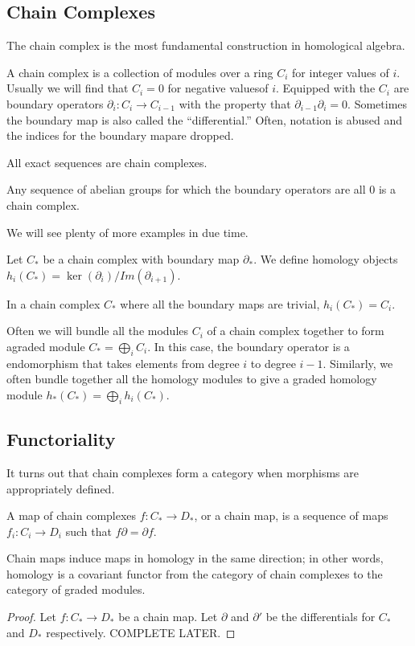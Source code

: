 \subsection{Chain Complexes}
The chain complex is the most fundamental construction in homological algebra.
\begin{definition} A chain complex is a collection of modules over a ring $C_i$
for integer values of $i$. Usually we will find that $C_i=0$ for negative valuesof $i$. Equipped with the $C_i$ are boundary operators
$\partial_i:C_i\rightarrow C_{i-1}$ with the property that
$\partial_{i-1}\partial_i=0$. Sometimes the boundary map is also called the
``differential.'' Often, notation is abused and the indices for the boundary mapare dropped.\end{definition}
\begin{example} All exact sequences are chain complexes. \end{example}
\begin{example} Any sequence of abelian groups for which the boundary operators
are all $0$ is a chain complex. \end{example}
We will see plenty of more examples in due time. 
\begin{definition} Let $C_*$ be a chain complex with boundary map $\partial_*$.
We define homology objects $h_i(C_*)=\ker(\partial_i)/Im(\partial_{i+1})$.
\end{definition}
\begin{example} In a chain complex $C_*$ where all the boundary maps are
trivial, $h_i(C_*)=C_i$. \end{example}

Often we will bundle all the modules $C_i$ of a chain complex together to form agraded module $C_*=\bigoplus_i C_i$. In this case, the boundary operator is a
endomorphism that takes elements from degree $i$ to degree $i-1$. Similarly, we
often bundle together all the homology modules to give a graded homology module
$h_*(C_*)=\bigoplus_i h_i(C_*)$.

\subsection{Functoriality}
It turns out that chain complexes form a category when morphisms are appropriately defined.
\begin{definition} A map of chain complexes $f:C_*\rightarrow D_*$, or a chain map, is a sequence of maps $f_i:C_i\rightarrow D_i$ such that $f\partial = \partial f$. \end{definition}
\begin{theorem} Chain maps induce maps in homology in the same direction; in other words, homology is a covariant functor from the category of chain complexes to the category of graded modules.\end{theorem}
\begin{proof}
Let $f:C_*\rightarrow D_*$ be a chain map. Let $\partial$ and $\partial'$ be the differentials for $C_*$ and $D_*$ respectively. COMPLETE LATER.



\end{proof}

